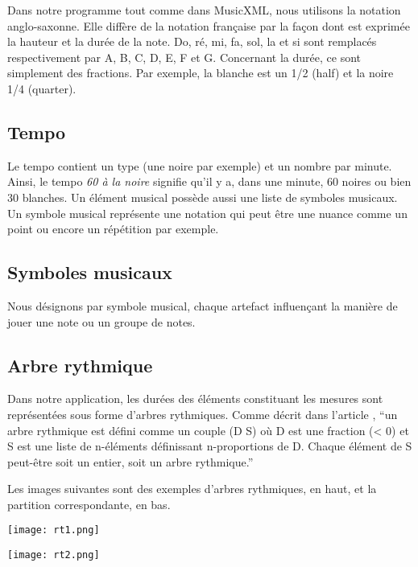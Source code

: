 \par
Dans notre programme tout comme dans MusicXML, nous utilisons la notation anglo-saxonne. Elle diffère de la notation française par la façon dont est exprimée la hauteur et la durée de la note. Do, ré, mi, fa, sol, la et si sont remplacés respectivement par A, B, C, D, E, F et G. Concernant la durée, ce sont simplement des fractions. Par exemple, la blanche est un 1/2 (half) et la noire 1/4 (quarter).



\subsection{Tempo}

Le tempo contient un type (une noire par exemple) et un nombre par minute. Ainsi, le tempo \emph{60 à la noire} signifie qu'il y a, dans une minute, 60 noires ou bien 30 blanches. Un élément musical possède aussi une liste de symboles musicaux. Un symbole musical représente une notation qui peut être une nuance comme un point ou encore un répétition par exemple.


\subsection{Symboles musicaux}

Nous désignons par symbole musical, chaque artefact influençant la manière de jouer une note ou un groupe de notes.


\subsection{Arbre rythmique}

\par
Dans notre application, les durées des éléments constituant les mesures sont représentées sous forme d'arbres rythmiques. Comme décrit dans l'article \cite{agon}, \enquote{un arbre rythmique est défini comme un couple (D S) où D est une fraction (< 0) et S est une liste de n-éléments définissant n-proportions de D. Chaque élément de S peut-être soit un entier, soit un arbre rythmique.}

\par
Les images suivantes sont des exemples d'arbres rythmiques, en haut, et la partition correspondante, en bas.


\begin{minipage}[c]{.46\linewidth}
  \centering
  \texttt{[image: rt1.png]}\\[1cm]
\end{minipage}
\hfill
\begin{minipage}[c]{.46\linewidth}
  \centering
  \texttt{[image: rt2.png]}\\[1cm]
\end{minipage}

